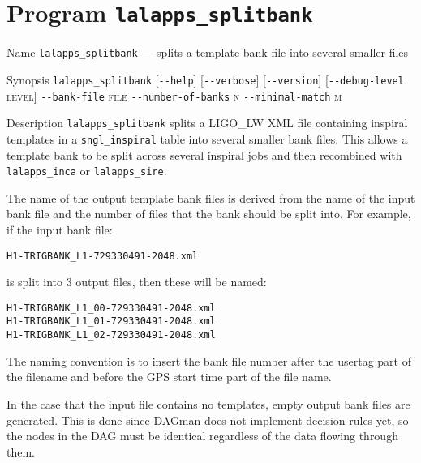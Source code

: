 \section{Program \texttt{lalapps\_splitbank}}
\label{program:lalapps-splitbank}

\begin{entry}
\item[Name]
\verb$lalapps_splitbank$ --- splits a template bank file into several smaller
files

\item[Synopsis]
\verb$lalapps_splitbank$ 
[\verb$--help$]
[\verb$--verbose$]
[\verb$--version$]
[\verb$--debug-level$ \textsc{level}]  \newline
\verb$--bank-file$ \textsc{file}
\verb$--number-of-banks$ \textsc{n}
\verb$--minimal-match$ \textsc{m}

\item[Description] 
\verb$lalapps_splitbank$ splits a LIGO\_LW XML file containing inspiral
templates in a \texttt{sngl\_inspiral} table into several smaller bank
files. This allows a template bank to be split across several inspiral 
jobs and then recombined with \texttt{lalapps\_inca} or
\texttt{lalapps\_sire}.

The name of the output template bank files is derived from the name of 
the input bank file and the number of files that the bank should be split
into. For example, if the input bank file:\\
\begin{center}
\texttt{H1-TRIGBANK\_L1-729330491-2048.xml}\\
\end{center}
is split into 3 output files, then these will be named:\\
\begin{center}
\texttt{H1-TRIGBANK\_L1\_00-729330491-2048.xml}\\
\texttt{H1-TRIGBANK\_L1\_01-729330491-2048.xml}\\
\texttt{H1-TRIGBANK\_L1\_02-729330491-2048.xml}\\
\end{center}
The naming convention is to insert the bank file number after the usertag part
of the filename and before the GPS start time part of the file name.

In the case that the input file contains no templates, empty output bank files
are generated. This is done since DAGman does not implement decision rules
yet, so the nodes in the DAG must be identical regardless of the data flowing
through them.


\end{entry}
